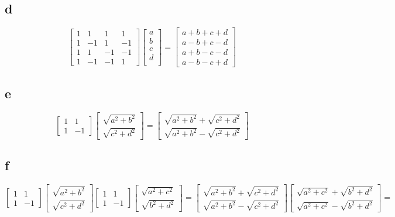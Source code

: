 \documentclass[letterpaper,notitlepage,twoside]{article}
\begin{document}
\subsection*{d}
\[
\begin{bmatrix}
1 &  1 &  1 &  1 \\
1 & -1 &  1 & -1 \\
1 &  1 & -1 & -1 \\
1 & -1 & -1 &  1 
\end{bmatrix}
\begin{bmatrix}
a \\
b \\
c \\
d \\
\end{bmatrix}
=
\begin{bmatrix}
a + b + c + d \\
a - b + c - d \\
a + b - c - d \\
a - b - c + d
\end{bmatrix}
\]
\subsection*{e}
\[
\begin{bmatrix}
1 &  1 \\
1 & -1
\end{bmatrix}
\begin{bmatrix}
\sqrt{a^2 + b^2} \\
\sqrt{c^2 + d^2}
\end{bmatrix}
=
\begin{bmatrix}
\sqrt{a^2 + b^2} + \sqrt{c^2 + d^2}\\
\sqrt{a^2 + b^2} - \sqrt{c^2 + d^2}
\end{bmatrix}
\]
\subsection*{f}
$\begin{bmatrix}
1 &  1 \\
1 & -1
\end{bmatrix}
\begin{bmatrix}
\sqrt{a^2 + b^2} \\
\sqrt{c^2 + d^2}
\end{bmatrix}
\begin{bmatrix}
1 &  1 \\
1 & -1
\end{bmatrix}
\begin{bmatrix}
\sqrt{a^2 + c^2} \\
\sqrt{b^2 + d^2}
\end{bmatrix}
=
\begin{bmatrix}
\sqrt{a^2 + b^2} + \sqrt{c^2 + d^2}\\
\sqrt{a^2 + b^2} - \sqrt{c^2 + d^2}
\end{bmatrix}
\begin{bmatrix}
\sqrt{a^2 + c^2} + \sqrt{b^2 + d^2} \\
\sqrt{a^2 + c^2} - \sqrt{b^2 + d^2}
\end{bmatrix}
=
$
\end{document}
